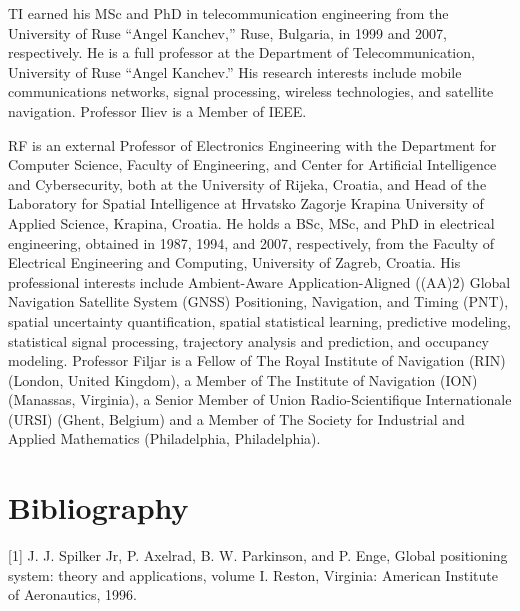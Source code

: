 \let\LaTeXcline\cline\documentclass[sn-mathphys-num]{sn-jnl}\let\cline\LaTeXcline
\begin{document}
TI earned his MSc and PhD in telecommunication engineering from the University of Ruse “Angel Kanchev,” Ruse, Bulgaria, in 1999 and 2007, respectively. He is a full professor at the Department of Telecommunication, University of Ruse “Angel Kanchev.” His research interests include mobile communications networks, signal processing, wireless technologies, and satellite navigation. Professor Iliev is a Member of IEEE.

RF is an external Professor of Electronics Engineering with the Department for Computer Science, Faculty of Engineering, and Center for Artificial Intelligence and Cybersecurity, both at the University of Rijeka, Croatia, and Head of the Laboratory for Spatial Intelligence at Hrvatsko Zagorje Krapina University of Applied Science, Krapina, Croatia. He holds a BSc, MSc, and PhD in electrical engineering, obtained in 1987, 1994, and 2007, respectively, from the Faculty of Electrical Engineering and Computing, University of Zagreb, Croatia. His professional interests include Ambient-Aware Application-Aligned ((AA)2) Global Navigation Satellite System (GNSS) Positioning, Navigation, and Timing (PNT), spatial uncertainty quantification, spatial statistical learning, predictive modeling, statistical signal processing, trajectory analysis and prediction, and occupancy modeling. Professor Filjar is a Fellow of The Royal Institute of Navigation (RIN) (London, United Kingdom), a Member of The Institute of Navigation (ION) (Manassas, Virginia), a Senior Member of Union Radio-Scientifique Internationale (URSI) (Ghent, Belgium) and a Member of The Society for Industrial and Applied Mathematics  (Philadelphia, Philadelphia).


\section{Bibliography}
[1] J. J. Spilker Jr, P. Axelrad, B. W. Parkinson, and P. Enge, Global positioning system: theory and applications, volume I. Reston, Virginia: American Institute of Aeronautics, 1996.
\end{document}
